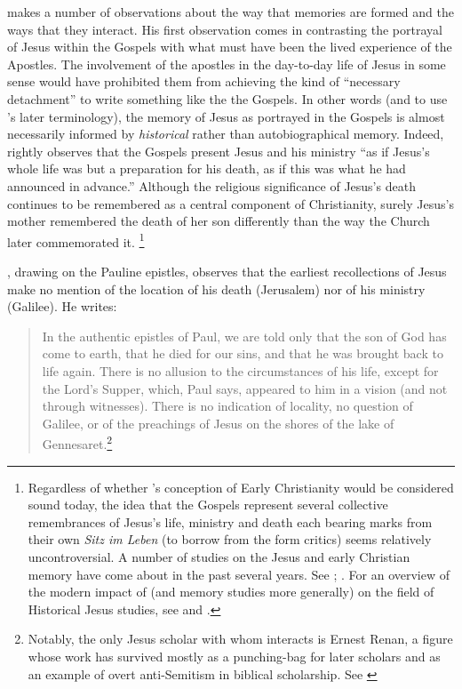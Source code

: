 \halbwachs makes a number of observations about the way that memories are formed and the ways that they interact. His first observation comes in contrasting the portrayal of Jesus within the Gospels with what must have been the lived experience of the Apostles.\autocite[193--198]{halbwachs1992} The involvement of the apostles in the day-to-day life of Jesus in some sense would have prohibited them from achieving the kind of ``necessary detachment'' to write something like the the Gospels. In other words (and to use \halbwachs's later terminology), the memory of Jesus as portrayed in the Gospels is almost necessarily informed by \emph{historical} rather than autobiographical memory.\autocite[194]{halbwachs1992} Indeed, \halbwachs rightly observes that the Gospels present Jesus and his ministry ``as if Jesus's whole life was but a preparation for his death, as if this was what he had announced in advance.''\autocite[198]{halbwachs1992} Although the religious significance of Jesus's death continues to be remembered as a central component of Christianity, surely Jesus's mother remembered the death of her son differently than the way the Church later commemorated it.%
%
\footnote{Regardless of whether \halbwachs's conception of Early Christianity would be considered sound today, the idea that the Gospels represent several collective remembrances of Jesus's life, ministry and death each bearing marks from their own \emph{Sitz im Leben} (to borrow from the form critics) seems relatively uncontroversial. A number of studies on the Jesus and early Christian memory have come about in the past several years. See \cite{ledonne2009}; \cite{rodriguez2010}. For an overview of the modern impact of \halbwachs (and memory studies more generally) on the field of Historical Jesus studies, see \cite{keith_ec2015} and \cite{keith_ec2015b}.}

\halbwachs, drawing on the Pauline epistles, observes that the earliest recollections of Jesus make no mention of the location of his death (Jerusalem) nor of his ministry (Galilee). He writes:  

\begin{quote}
    In the authentic epistles of Paul, we are told only that the son of God has come to earth, that he died for our sins, and that he was brought back to life again. There is no allusion to the circumstances of his life, except for the Lord's Supper, which, Paul says, appeared to him in a vision (and not through witnesses). There is no indication of locality, no question of Galilee, or of the preachings of Jesus on the shores of the lake of Gennesaret.\autocite[209]{halbwachs1992}\footnote{Notably, the only Jesus scholar with whom \halbwachs interacts is Ernest Renan, a figure whose work has survived mostly as a punching-bag for later scholars and as an example of overt anti-Semitism in biblical scholarship. See \cite[39]{heschel2008}}
\end{quote}  

